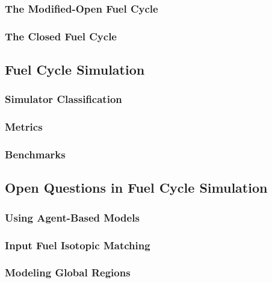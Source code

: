 \subsubsection{The Modified-Open Fuel Cycle}

\subsubsection{The Closed Fuel Cycle}

\subsection{Fuel Cycle Simulation}

\subsubsection{Simulator Classification}

\subsubsection{Metrics}

\subsubsection{Benchmarks}

\subsection{Open Questions in Fuel Cycle Simulation}

\subsubsection{Using Agent-Based Models}

\subsubsection{Input Fuel Isotopic Matching}

\subsubsection{Modeling Global Regions}

